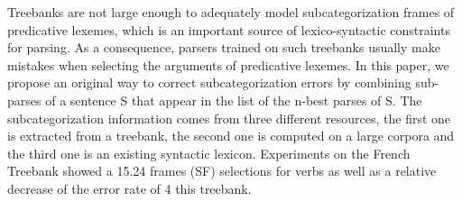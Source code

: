 Treebanks are not large enough to adequately model   subcategorization frames of predicative lexemes, which is an
   important source of lexico-syntactic constraints for parsing. As a
   consequence, parsers trained on such treebanks usually make mistakes
   when selecting the arguments of predicative lexemes. In this paper,
   we propose an original way to correct subcategorization errors by
   combining sub-parses of a sentence S that appear in the list of
   the n-best parses of S. The subcategorization information comes
   from three different resources, the first one is extracted from a
   treebank, the second one is computed on a large corpora and the
   third one is an existing syntactic lexicon. Experiments on the
   French Treebank showed a 15.24%
   frames (SF) selections for verbs as well as a relative decrease of the error
   rate of 4%
   this treebank.

